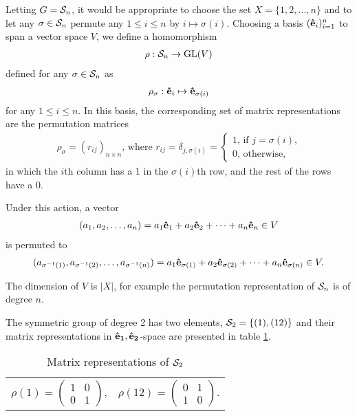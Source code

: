 	Letting $G = \mathcal{S}_n$, it would be appropriate to choose the set $X = \{1, 2, \dots, n\}$ and to let any $\sigma \in \mathcal{S}_n$ permute any $1 \leq i \leq n$ by $i \mapsto \sigma(i)$. Choosing a basis $(\mathbf{\hat{e}}_i)_{i=1}^n$ to span a vector space $V$, we define a homomorphism
	\begin{align*}
		\rho: \mathcal{S}_n \rightarrow \text{GL}(V)
	\end{align*}
	defined for any $\sigma \in \mathcal{S}_n$ as
	\begin{align*}
		\rho_\sigma: \mathbf{\hat{e}}_i \mapsto \mathbf{\hat{e}}_{\sigma(i)}
	\end{align*}
	for any $1 \leq i \leq n$. In this basis, the corresponding set of matrix representations are the permutation matrices
	\begin{align*}
		\rho_\sigma = (r_{ij})_{n \times n} \text{, where } r_{ij} = \delta_{j,\sigma(i)} = \begin{cases}
			1 \text{, if $j = \sigma(i)$,} \\
			0 \text{, otherwise,}
		\end{cases}
	\end{align*}
	in which the $i$th column has a 1 in the $\sigma(i)$th row, and the rest of the rows have a 0.
	
	Under this action, a vector
	\begin{align*}
		(a_1, a_2, \dots, a_n) = a_1 \mathbf{\hat{e}}_1 + a_2 \mathbf{\hat{e}}_2 + \dots + a_n \mathbf{\hat{e}}_n \in V
	\end{align*}
	is permuted to 
	\begin{align*}
		(a_{\sigma^{-1}(1)}, a_{\sigma^{-1}(2)}, \dots, a_{\sigma^{-1}(n)}) = a_1 \mathbf{\hat{e}}_{\sigma(1)} + a_2 \mathbf{\hat{e}}_{\sigma(2)} + \dots + a_n \mathbf{\hat{e}}_{\sigma(n)}  \in V.
	\end{align*}
	
	
	The dimension of $V$ is $|X|$, for example the permutation representation of $\mathcal{S}_n$ is of degree $n$.
	
	\begin{example}
		The symmetric group of degree 2 has two elements, $\mathcal{S}_2 = \{(1), (12)\}$ and their matrix representations in $\mathbf{\mathbf{\hat{e}}_1},\mathbf{\mathbf{\hat{e}}_2}$-space are presented in table \ref{table:permS2}.
		\begin{table}[hbt!]
			\centering
			\begin{tabular}{c c}
				$\rho(1) =
				\begin{pmatrix}
					1 & 0 \\ 0 & 1
				\end{pmatrix}$, &
				$\rho(12) =
				\begin{pmatrix}
					0 & 1 \\ 1 & 0
				\end{pmatrix}$.
			\end{tabular}
			\caption{Matrix representations of $\mathcal{S}_2$}
			\label{table:permS2}
		\end{table}
	\end{example}
	
